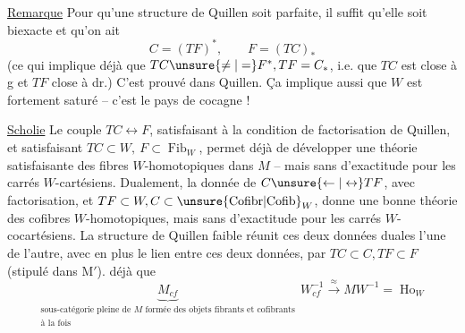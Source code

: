 \uline{Remarque} Pour qu'une structure de Quillen  soit parfaite, il suffit qu'elle soit biexacte et qu'on ait
\[
 C=(TF)^{*},\qquad F=(TC)_{*}
\]
 (ce qui implique déjà que $TC\unsure{\ne|=}F^{*},TF=C_{*}$, i.e. que $TC$ est close à g et $TF$ close à dr.) C'est prouvé dans Quillen. Ça implique aussi que $W$ est fortement saturé -- c'est le pays de cocagne !

\uline{Scholie}\unsure{:} Le couple $TC\longleftrightarrow F$, satisfaisant à la condition de factorisation de Quillen, et satisfaisant $TC\subset W,\ F\subset\operatorname{Fib}_{W}$, permet déjà de développer une théorie satisfaisante des fibres $W$-homotopiques dans $M$ -- mais sans   d'exactitude pour les carrés $W$-cartésiens. Dualement, la donnée de $C\unsure{\leftarrow|\leftrightarrow}TF$, avec factorisation, et $TF\subset W,C\subset\operatorname{\unsure{Cofibr|Cofib}}_{W}$, donne une bonne théorie des cofibres $W$-homotopiques, mais sans   d'exactitude pour les carrés $W$-cocartésiens. La structure de Quillen faible réunit ces deux données duales l'une de l'autre, avec en plus le lien   entre ces deux données, par $TC\subset C,TF\subset F$ (stipulé dans $\mathrm M'$).   déjà que
\[
\underbrace{M_{cf}}_{\substack{\text{sous-catégorie pleine de }M\text{ formée des objets fibrants et cofibrants}\\\text{à la fois}}}\,W_{cf}^{-1}\xrightarrow{\approx}MW^{-1}=\operatorname{Ho}_{W}
\]
